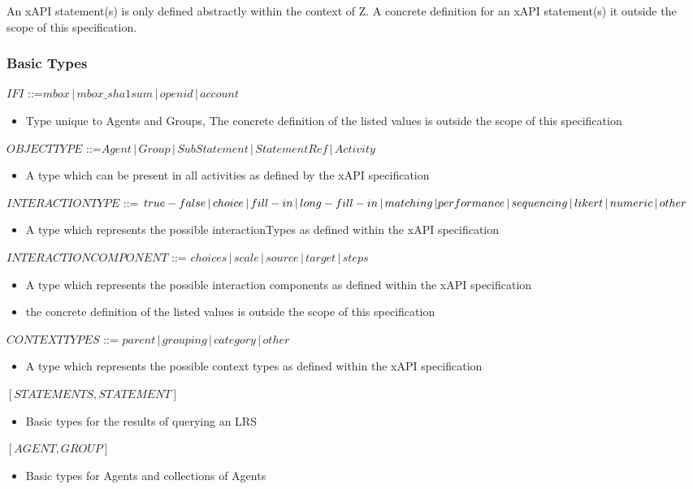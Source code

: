 \documentclass{article}
\begin{document}


  An xAPI statement(s) is only defined abstractly within the context
  of Z. A concrete definition for an xAPI statement(s) it outside the
  scope of this specification.

  \subsubsection{Basic Types}
  $IFI$ ::=$ mbox \,|\, mbox\_sha1sum \,|\, openid \,|\, account$
  \begin{itemize}
  \item Type unique to Agents and Groups, The concrete definition of the listed values
    is outside the scope of this specification
  \end{itemize}
  $OBJECTTYPE$ ::=$ Agent \,|\, Group \,|\, SubStatement \,|\,
  StatementRef \,|\, Activity$
  \begin{itemize}
  \item A type which can be present in all activities as defined by
    the xAPI specification
  \end{itemize}
  $INTERACTIONTYPE$ ::= $true-false \,|\, choice \,|\, fill-in \,|\,
  long-fill-in \,|\, matching \,| \\ performance \,|\, sequencing \,|\,
  likert \,|\, numeric \,|\, other$
  \begin{itemize}
  \item A type which represents the possible interactionTypes as
      defined within the xAPI specification
  \end{itemize}
  $INTERACTIONCOMPONENT$ ::= $choices \,|\, scale \,|\, source \,|\,
  target \,|\, steps$
  \begin{itemize}
  \item A type which represents the possible interaction components as
    defined within the xAPI specification
  \item the concrete definition of the listed values is outside the
    scope of this specification
  \end{itemize}
  $CONTEXTTYPES$ ::= $parent \,|\, grouping \,|\, category \,|\, other$
  \begin{itemize}
  \item A type which represents the possible context types as
    defined within the xAPI specification
  \end{itemize}
  $[STATEMENTS, STATEMENT]$
  \begin{itemize}
  \item Basic types for the results of querying an LRS
  \end{itemize}
  $[AGENT, GROUP]$
  \begin{itemize}
  \item Basic types for Agents and collections of Agents
  \end{itemize}
\end{document}
